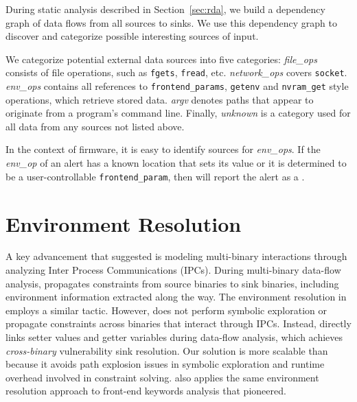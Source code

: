 During static analysis described in Section~\ref{sec:rda}, we build a dependency graph of data flows from all sources to sinks.
We use this dependency graph to discover and categorize possible interesting sources of input.

We categorize potential external data sources into five categories:
\textit{file\_ops} consists of file operations, such as \texttt{fgets}, \texttt{fread}, etc.
\textit{network\_ops} covers \texttt{socket}.
\textit{env\_ops} contains all references to \texttt{frontend\_params}, \texttt{getenv} and \texttt{nvram\_get} style operations, which retrieve stored data.
\textit{argv} denotes paths that appear to originate from a program's command line.
Finally, \textit{unknown} is a category used for all data from any sources not listed above.

In the context of firmware, it is easy to identify sources for \textit{env\_ops}.
If the \textit{env\_op} of an alert has a known location that sets its value or it is determined to be a user-controllable \texttt{frontend\_param}, then \mango will report the alert as a \trupoc.


\section{Environment Resolution}
\label{sec:environment}

A key advancement that \karonte suggested is modeling multi-binary interactions through analyzing Inter Process Communications (IPCs).
During multi-binary data-flow analysis, \karonte propagates constraints from source binaries to sink binaries, including environment information extracted along the way.
The environment resolution in \mango employs a similar tactic.
However, \mango does not perform symbolic exploration or propagate constraints across binaries that interact through IPCs.
Instead, \mango directly links setter values and getter variables during data-flow analysis, which achieves \emph{cross-binary} vulnerability sink resolution.
Our solution is more scalable than \karonte because it avoids path explosion issues in symbolic exploration and runtime overhead involved in constraint solving.
\mango also applies the same environment resolution approach to front-end keywords analysis that \satc pioneered.


